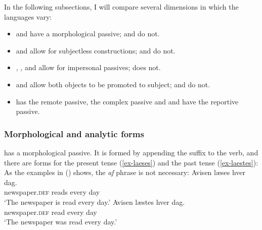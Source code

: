 In the following subsections, I will compare several dimensions in which the  languages
vary:
\begin{itemize}
\item {} and  have a morphological passive;  and  do not.

\item {} and  allow for subjectless constructions;  and  do not.

\item {}, , and  allow for impersonal passives;  does not.

\item {} and  allow both objects to be promoted to subject;  and  do not.

\item {} has the remote passive,  the complex passive and  and 
  have the reportive passive.
\end{itemize}



\subsubsection{Morphological and analytic forms}

 has a morphological passive. It is formed by appending the suffix  to the verb, and there
are forms for the present tense (\ref{ex-laeses}) and the past tense (\ref{ex-laestes}):
\eal
{}
\zl
As the examples in () shows, the \emph{af} phrase is not necessary:
\eal
\ex 
\gll Avisen        læses           hver   dag.\\
     newspaper.\textsc{def} reads  every day\\\danish
\glt `The newspaper is read every day.'
\ex 
\gll Avisen        læstes           hver   dag.\\
     newspaper.\textsc{def} read  every day\\
\glt `The newspaper was read every day.'
\zl

